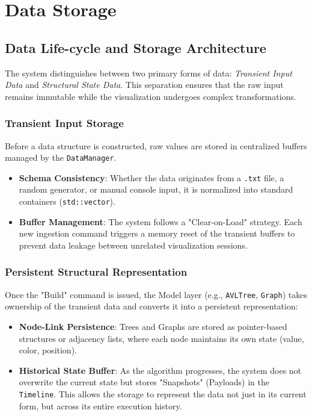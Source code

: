 \section{Data Storage}

\subsection{Data Life-cycle and Storage Architecture}
The system distinguishes between two primary forms of data: \textit{Transient Input Data} and \textit{Structural State Data}. This separation ensures that the raw input remains immutable while the visualization undergoes complex transformations.

\subsubsection{Transient Input Storage}
Before a data structure is constructed, raw values are stored in centralized buffers managed by the \texttt{DataManager}. 
\begin{itemize}
    \item \textbf{Schema Consistency}: Whether the data originates from a \texttt{.txt} file, a random generator, or manual console input, it is normalized into standard containers (\texttt{std::vector}).
    \item \textbf{Buffer Management}: The system follows a "Clear-on-Load" strategy. Each new ingestion command triggers a memory reset of the transient buffers to prevent data leakage between unrelated visualization sessions.
\end{itemize}

\subsubsection{Persistent Structural Representation}
Once the "Build" command is issued, the Model layer (e.g., \texttt{AVLTree}, \texttt{Graph}) takes ownership of the transient data and converts it into a persistent representation:
\begin{itemize}
    \item \textbf{Node-Link Persistence}: Trees and Graphs are stored as pointer-based structures or adjacency lists, where each node maintains its own state (value, color, position).
    \item \textbf{Historical State Buffer}: As the algorithm progresses, the system does not overwrite the current state but stores "Snapshots" (Payloads) in the \texttt{Timeline}. This allows the storage to represent the data not just in its current form, but across its entire execution history.
\end{itemize}